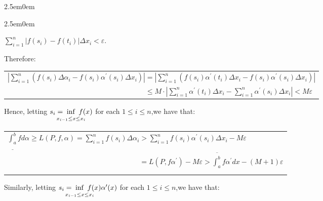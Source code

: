 \documentclass{book}
\newenvironment{myIndent}{%
   \begin{adjustwidth}{2.5em}{0em}%
}{%
   \end{adjustwidth}%
}
\newcommand{\retTwo}{\hfill\bigbreak}
\begin{document}
{\begin{myIndent}
\begin{myIndent}
      {\centering $\sum\limits_{i=1}^n|f(s_i) - f(t_i)|\Delta x_i < \varepsilon$. \retTwo\par}

      Therefore:

      \begin{center}
         {\fontsize{11.5}{13.5}\selectfont\begin{tabular}{l}
            $\left|\sum\limits_{i=1}^n\left( f(s_i)\Delta\alpha_i - f(s_i)\alpha^\prime(s_i)\Delta x_i\right)\right| = \left|\sum\limits_{i=1}^n\left( f(s_i)\alpha^\prime(t_i)\Delta x_i -f(s_i)\alpha^\prime(s_i)\Delta x_i\right)\right|$\\ [12pt]

            $\phantom{\left|\sum\limits_{i=1}^n\left( f(s_i)\Delta\alpha_i - f(s_i)\alpha^\prime(s_i)\Delta x_i\right)\right|} \leq M \cdot \left|\sum\limits_{i=1}^n \alpha^\prime(t_i)\Delta x_i - \sum\limits_{i=1}^n \alpha^\prime(s_i)\Delta x_i\right| < M\varepsilon$\\ [4pt]
         \end{tabular}}\retTwo
      \end{center}

      Hence, letting $s_i = \hspace{-1.2em}\inf\limits_{x_{i-1}\leq\vphantom{\int^a} x \leq x_i}\hspace{-1.15em}f(x)$ for each $1 \leq i \leq n$,we have that:

      \begin{center}
         {\fontsize{11.4}{13.4}\selectfont\begin{tabular}{l}
            $\underline{\int_a^b}fd\alpha \geq L(P, f, \alpha) = \sum\limits_{i=1}^nf(s_i)\Delta\alpha_i > \sum\limits_{i=1}^nf(s_i)\alpha^\prime(s_i)\Delta x_i - M\varepsilon$\\ [8pt]

            $\phantom{\underline{\int_a^b}fd\alpha \geq L(P, f, \alpha) = \sum\limits_{i=1}^nf(s_i)\Delta\alpha_i} = L(P, f\alpha^\prime) - M\varepsilon > \overline{\int_a^b}f\alpha^\prime dx - (M + 1)\varepsilon$
         \end{tabular}}\retTwo
      \end{center}

      Similarly, letting $s_i = \hspace{-1.2em}\inf\limits_{x_{i-1}\leq\vphantom{\int^a} x \leq x_i}\hspace{-1.15em}f(x)\alpha^\prime(x)$ for each $1 \leq i \leq n$,we have that:


\end{myIndent}
\end{myIndent}}
\end{document}
